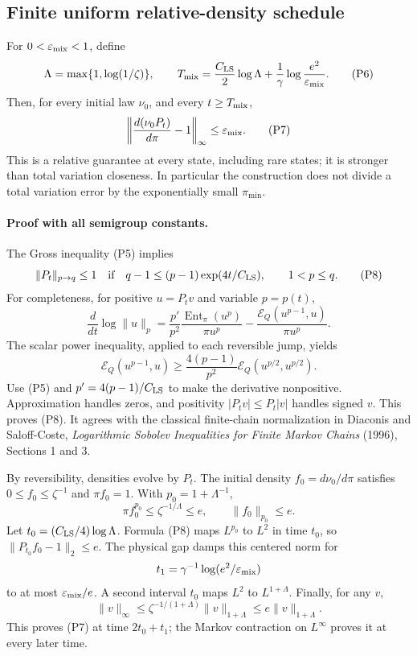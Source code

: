 \subsection{Finite uniform relative-density schedule}

For \(0<\varepsilon_{\rm mix}<1\), define
\[
 \Lambda=\max\{1,\log(1/\zeta)\},\qquad
 T_{\rm mix}
 =\frac{C_{\rm LS}}2\log\Lambda+
    \frac1\gamma\log\frac{e^2}{\varepsilon_{\rm mix}}.             \tag{P6}
\]
Then, for every initial law \(\nu_0\), and every \(t\ge T_{\rm mix}\),
\[
 \left\|\frac{d(\nu_0P_t)}{d\pi}-1\right\|_\infty
 \le\varepsilon_{\rm mix}.                                      \tag{P7}
\]
This is a relative guarantee at every state, including rare states; it is
stronger than total variation closeness. In particular the construction does
not divide a total variation error by the exponentially small \(\pi_{\min}\).

\paragraph{Proof with all semigroup constants.}
The Gross inequality (P5) implies
\[
 \|P_t\|_{p\to q}\le1
 \quad\hbox{if}\quad
 q-1\le(p-1)\exp(4t/C_{\rm LS}),\qquad 1<p\le q.                  \tag{P8}
\]
For completeness, for positive \(u=P_t v\) and variable \(p=p(t)\),
\[
 \frac{d}{dt}\log\|u\|_p
 =
 \frac{p'}{p^2}\frac{\operatorname{Ent}_\pi(u^p)}{\pi u^p}
 -
 \frac{\mathcal E_Q(u^{p-1},u)}{\pi u^p}.
\]
The scalar power inequality, applied to each reversible jump, yields
\[
 \mathcal E_Q(u^{p-1},u)
 \ge \frac{4(p-1)}{p^2}
       \mathcal E_Q(u^{p/2},u^{p/2}).
\]
Use (P5) and \(p'=4(p-1)/C_{\rm LS}\) to make the derivative
nonpositive. Approximation handles zeros, and positivity
\(|P_t v|\le P_t|v|\) handles signed \(v\). This proves (P8).
It agrees with the classical finite-chain normalization in Diaconis and
Saloff-Coste, \emph{Logarithmic Sobolev Inequalities for Finite Markov Chains}
(1996), Sections 1 and 3.

By reversibility, densities evolve by \(P_t\). The initial density
\(f_0=d\nu_0/d\pi\) satisfies \(0\le f_0\le\zeta^{-1}\) and
\(\pi f_0=1\). With \(p_0=1+\Lambda^{-1}\),
\[
 \pi f_0^{p_0}\le\zeta^{-1/\Lambda}\le e,
 \qquad \|f_0\|_{p_0}\le e.
\]
Let \(t_0=(C_{\rm LS}/4)\log\Lambda\). Formula (P8) maps
\(L^{p_0}\) to \(L^2\) in time \(t_0\), so
\(\|P_{t_0}f_0-1\|_2\le e\). The physical gap damps this centered
norm for
\[
 t_1=\gamma^{-1}\log(e^2/\varepsilon_{\rm mix})
\]
to at most \(\varepsilon_{\rm mix}/e\).
A second interval \(t_0\) maps \(L^2\) to \(L^{1+\Lambda}\).
Finally, for any \(v\),
\[
 \|v\|_\infty
 \le\zeta^{-1/(1+\Lambda)}\|v\|_{1+\Lambda}
 \le e\|v\|_{1+\Lambda}.
\]
This proves (P7) at time \(2t_0+t_1\); the Markov contraction on
\(L^\infty\) proves it at every later time.

